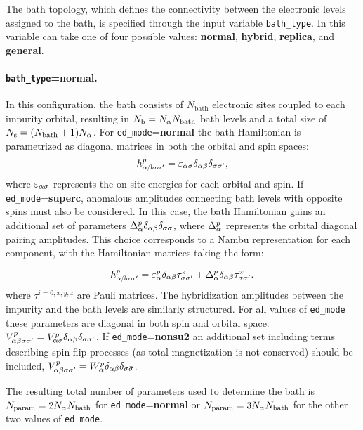 \documentclass[edipack_sp.tex]{subfiles}
\begin{document}
The bath topology, which defines the connectivity between the
electronic levels assigned to the bath, is specified
through the input variable {\tt bath\_type}. 
In \NAME this variable can take one of four possible values: 
{\bf normal}, {\bf hybrid}, {\bf replica}, and {\bf general}.


\paragraph{{\tt bath\_type}={\bf normal}.} In this configuration, the
bath consists of $N_\mathrm{bath}$
electronic sites coupled to each impurity orbital, resulting
in $N_\mathrm{b} = N_\alpha N_\mathrm{bath}$ bath levels and a total size of $N_\mathrm{s}=(N_\mathrm{bath}+1)N_\alpha$.
For {\tt ed\_mode}={\bf normal} the bath Hamiltonian is parametrized as diagonal matrices in both the orbital and spin spaces:
$$
h^p_{\alpha\beta\sigma\sigma'}=\varepsilon_{\alpha\sigma}\delta_{\alpha\beta}\delta_{\sigma\sigma'},
$$
where $\varepsilon_{\alpha\sigma}$ represents  the on-site energies for each orbital and spin. 
%
If {\tt ed\_mode}={\bf superc},  anomalous
amplitudes connecting bath levels with opposite spins must also be
considered. In this case, the bath Hamiltonian gains 
an additional set of parameters $\Delta^p_{\alpha}\delta_{\alpha\beta}\delta_{\sigma \bar{\sigma}}$, where $\Delta^p_\alpha$ represents the orbital diagonal pairing amplitudes. 
This choice corresponds to a Nambu representation for each component, with the Hamiltonian matrices taking the form:

$$
h_{\alpha\beta\sigma\sigma'}^p = \varepsilon_\alpha^p\delta_{\alpha\beta}\tau^z_{\sigma\sigma'} + \Delta^p_\alpha\delta_{\alpha\beta}\tau^x_{\sigma\sigma'} .
$$
where $\tau^{i=0,x,y,z}$ are Pauli matrices.
%
The hybridization amplitudes between the impurity and the bath levels
are similarly structured. For all values of {\tt ed\_mode} these
parameters are diagonal in both
spin and orbital space: $V^p_{\alpha\beta\sigma\sigma'}=V^p_{\alpha\sigma}\delta_{\alpha\beta}\delta_{\sigma\sigma'}$.
%
If {\tt ed\_mode}={\bf nonsu2}  an additional set including terms describing spin-flip processes (as total magnetization is not conserved) should be included, $V^p_{\alpha\beta\sigma\sigma'} =
W^p_{\alpha}\delta_{\alpha\beta}\delta_{\sigma \bar{\sigma}}$. 
%

The resulting total number of parameters used to determine the bath is $N_\mathrm{param}=2N_\alpha N_\mathrm{bath}$ for {\tt ed\_mode}={\bf normal} or $N_\mathrm{param}=3N_\alpha N_\mathrm{bath}$ for the other two values of {\tt ed\_mode}.
\end{document}
